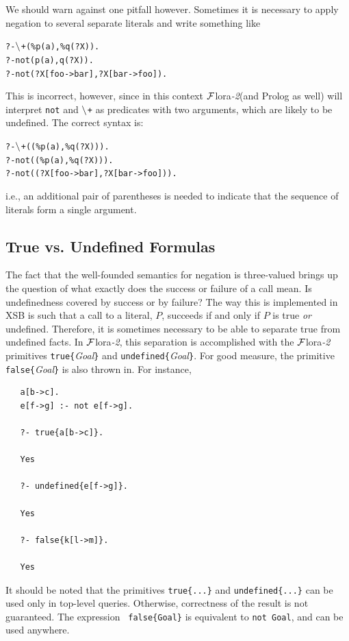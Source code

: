 \documentclass[11pt]{article}
\newcommand{\FLORA}{{\mbox{\sc ${\cal F}${lora}\rm\emph{-2}}}\xspace}
\newcommand{\NAF}{\mbox{\tt \ensuremath{\tt\backslash}+}\xspace}
\newcommand{\TNOT}{{{\tt not}}\xspace}
\begin{document}
We should warn against one pitfall however. Sometimes it is necessary to
apply negation to several separate literals and write something like
\begin{alltt}
       ?- \NAF(\%p(a),\%q(?X)).
       ?- \TNOT(p(a),q(?X)).
       ?- \TNOT(?X[foo->bar], ?X[bar->foo]).
\end{alltt}
This is incorrect, however, since in this context \FLORA (and Prolog as
well) will interpret \TNOT and \NAF as predicates with two arguments,
which are likely to be undefined. The correct syntax is:
\begin{alltt}
       ?- \NAF((\%p(a),\%q(?X))).
       ?- \TNOT((\%p(a),\%q(?X))).
       ?- \TNOT((?X[foo->bar], ?X[bar->foo])).
\end{alltt}
i.e., an additional pair of parentheses is needed to indicate that
the sequence of literals form a single argument.

\subsection{True vs. Undefined Formulas}

The fact that the well-founded semantics for negation is three-valued
brings up the question of what exactly does the success or failure of a
call mean. Is undefinedness covered by success or by failure?  The way
this is implemented in XSB is such that a call to a literal, $P$, succeeds
if and only if $P$ is true \emph{or} undefined.  Therefore, it is sometimes
necessary to be able to separate true from undefined facts. In \FLORA, this
separation is accomplished with the \FLORA primitives
{\tt true\{}\emph{Goal}{\tt \}} and {\tt undefined\{}\emph{Goal}{\tt \}}.
For good measure, the primitive {\tt false\{}\emph{Goal}{\tt \}} is also
thrown in. For instance,
\begin{verbatim}
   a[b->c].
   e[f->g] :- not e[f->g].

   ?- true{a[b->c]}.

   Yes

   ?- undefined{e[f->g]}.

   Yes

   ?- false{k[l->m]}.

   Yes
\end{verbatim}
It should be noted that the primitives {\tt true\{...\}}  and
{\tt undefined\{...\}} can be used only in top-level queries. Otherwise,
correctness of the result is not guaranteed. The expression {\tt
  false\{Goal\}} is equivalent to {\tt not Goal},  and can be used
anywhere.
\end{document}
